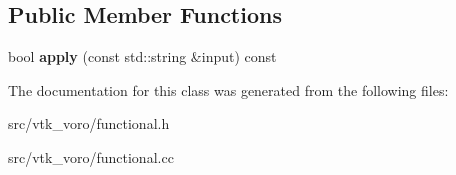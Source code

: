 \subsection*{Public Member Functions}
\begin{DoxyCompactItemize}
\item 
bool {\bfseries apply} (const std\+::string \&input) const \hypertarget{classtools_1_1Predicates_1_1IS__EMPTY__STRING_ac87e57d55424beb5deb0a5d95b5c7363}{}\label{classtools_1_1Predicates_1_1IS__EMPTY__STRING_ac87e57d55424beb5deb0a5d95b5c7363}

\end{DoxyCompactItemize}


The documentation for this class was generated from the following files\+:\begin{DoxyCompactItemize}
\item 
src/vtk\+\_\+voro/functional.\+h\item 
src/vtk\+\_\+voro/functional.\+cc\end{DoxyCompactItemize}
